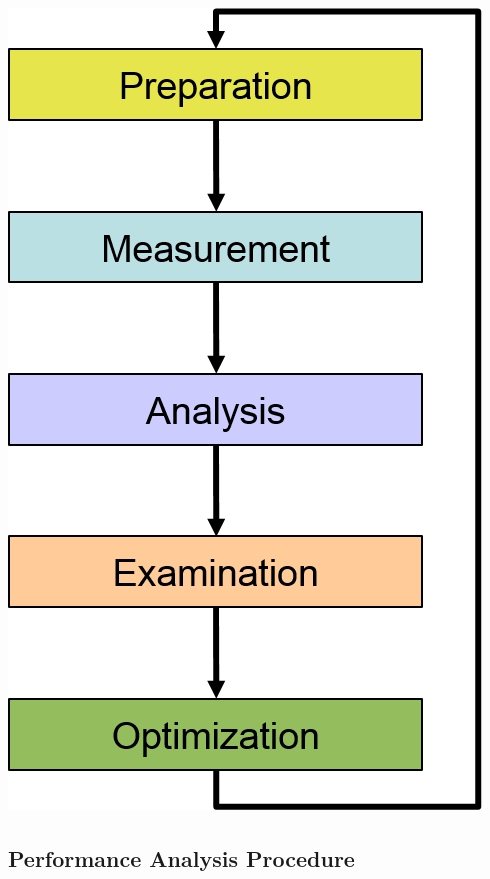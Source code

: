 \begin{minipage}{.15\columnwidth}
\centering
\includegraphics[width=\textwidth]{Workflow}
\end{minipage}

\subsection{Performance Analysis Procedure}
  
